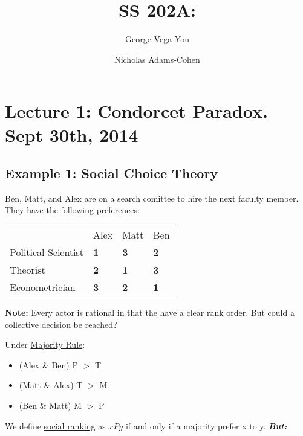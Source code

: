 \documentclass{article}
\title{SS 202A: }
\author{George Vega Yon\and Nicholas Adams-Cohen}
\begin{document}
\maketitle


\section*{Lecture 1: Condorcet Paradox. Sept 30th, 2014}

\subsection*{Example 1: Social Choice Theory}
Ben, Matt, and Alex are on a search comittee to hire the next faculty member. They have the following preferences: 

\begin{table}[h]
\centering
\begin{tabular}{llll}
                                         & Alex                            & Matt                            & Ben                             \\ \cline{2-4} 
\multicolumn{1}{l|}{Political Scientist} & \multicolumn{1}{l|}{\textbf{1}} & \multicolumn{1}{l|}{\textbf{3}} & \multicolumn{1}{l|}{\textbf{2}} \\ \cline{2-4} 
\multicolumn{1}{l|}{Theorist}            & \multicolumn{1}{l|}{\textbf{2}} & \multicolumn{1}{l|}{\textbf{1}} & \multicolumn{1}{l|}{\textbf{3}} \\ \cline{2-4} 
\multicolumn{1}{l|}{Econometrician}      & \multicolumn{1}{l|}{\textbf{3}} & \multicolumn{1}{l|}{\textbf{2}} & \multicolumn{1}{l|}{\textbf{1}} \\ \cline{2-4} 
\end{tabular}
\end{table}

\textbf{Note:} Every actor is rational in that the have a clear rank order. But could a collective decision be reached?

Under \underline{Majority Rule}:
\begin{itemize}

\item (Alex \& Ben) P $>$ T
\item (Matt \& Alex) T $>$ M
\item (Ben \& Matt) M $>$ P
\end{itemize}

We define \underline{social ranking} as $xPy$ if and only if a majority prefer x to y. 
\emph{\textbf{But:}}
\end{document}
